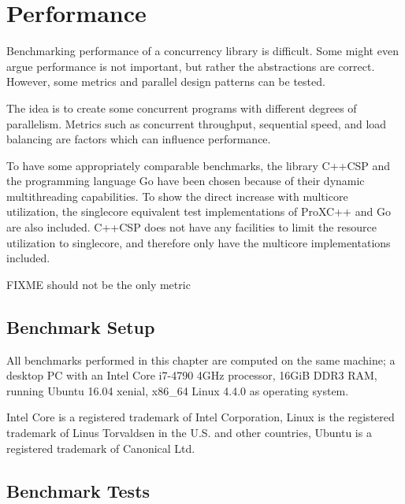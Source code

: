
\chapter{Performance}
\label{ch:performance}

Benchmarking performance of a concurrency library is difficult. Some might even argue performance is not important, but rather the abstractions are correct. However, some metrics and parallel design patterns can be tested. 

The idea is to create some concurrent programs with different degrees of parallelism. Metrics such as concurrent throughput, sequential speed, and load balancing are factors which can influence performance.

To have some appropriately comparable benchmarks, the library C++CSP and the programming language Go have been chosen because of their dynamic multithreading capabilities. To show the direct increase with multicore utilization, the singlecore equivalent test implementations of ProXC++ and Go are also included. C++CSP does not have any facilities to limit the resource utilization to singlecore, and therefore only have the multicore implementations included.

FIXME should not be the only metric


\section{Benchmark Setup}
\label{sec:benchmark_setup}

All benchmarks performed in this chapter are computed on the same machine; a desktop PC with an Intel\textregistered{} Core\texttrademark{} i7-4790 4GHz processor, 16GiB DDR3 RAM, running Ubuntu\textregistered{} 16.04 xenial, x86\_64 Linux\textregistered{} 4.4.0 as operating system.

Intel Core is a registered trademark of Intel Corporation, Linux is the registered trademark of Linus Torvaldsen in the U.S. and other countries, Ubuntu is a registered trademark of Canonical Ltd.


\section{Benchmark Tests}
\label{sec:benchmark_tests}

